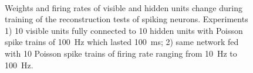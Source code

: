 \documentclass{article}
\begin{document}
\begin{figure}
{	}
	\\
	\caption{Weights and firing rates of visible and hidden units change during training of the reconstruction tests of spiking neurons. 
		Experiments 1) 10 visible units fully connected to 10 hidden units with Poisson spike trains of 100~Hz which lasted 100~ms; 2) same network fed with 10 Poisson spike trains of firing rate ranging from 10~Hz to 100~Hz.}
\end{figure}
\end{document}
